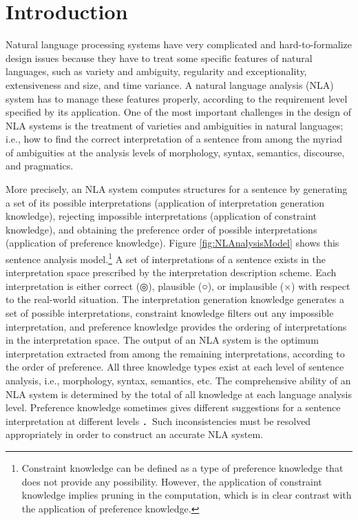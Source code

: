 \documentclass[english]{jnlp_1.4_rep}
\theoremstyle{break}
\theoremstyle{plain}
\theoremstyle{plain}
\begin{document}
\maketitle

\vspace{2pt}
\section{Introduction}

Natural language processing systems have very complicated and
hard-to-formalize design 
\linebreak
issues because they have to treat some
specific features of natural languages, such as variety and 
\linebreak
ambiguity,
regularity and exceptionality, extensiveness and size, and time
variance. A natural language analysis (NLA) system has to manage these
features properly, according to the requirement level specified by its
application. One of the most important challenges in the design of NLA
systems is the treatment of varieties and ambiguities in natural
languages; i.e., how to find the correct interpretation of a sentence
from among the myriad of ambiguities at the analysis
levels of morphology, syntax, semantics, discourse, and pragmatics.

More precisely, an NLA system computes structures for a sentence by
generating a set of its possible interpretations (application of
interpretation generation knowledge), rejecting impossible
interpretations (application of constraint knowledge), and obtaining
the preference order of possible interpretations (application of
preference knowledge). 
\pagebreak
Figure \ref{fig:NLAnalysisModel} shows this
sentence analysis model.\footnote{Constraint knowledge can be defined
  as a type of preference knowledge that does not provide any
  possibility. However, the application of constraint knowledge
  implies pruning in the computation, which is in clear contrast with
  the application of preference knowledge.} A set of interpretations
of a sentence exists in the interpretation space prescribed by the
interpretation description scheme. Each interpretation is either
correct (◎), plausible (○), or implausible (×) with respect
to the real-world situation. The interpretation generation knowledge
generates a set of possible interpretations, constraint knowledge
filters out any impossible interpretation, and preference knowledge
provides the ordering of interpretations in the interpretation
space. The output of an NLA system is the optimum interpretation
extracted from among the remaining interpretations, according to the
order of preference. All three knowledge types exist at each level of
sentence analysis, i.e., morphology, syntax, semantics, etc. The
comprehensive ability of an NLA system is determined by the total of
all knowledge at each language analysis level. Preference knowledge
sometimes gives different suggestions for a sentence interpretation at
different levels \cite{Hirakawa89}．Such inconsistencies must be
resolved appropriately in order to construct an accurate NLA system.
\end{document}
